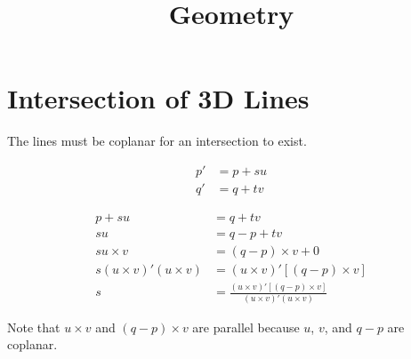 \documentclass{article}
\begin{document}
\title{Geometry}
\author{}
\date{}
\maketitle

\section{Intersection of 3D Lines}

The lines must be coplanar for an intersection to exist.

\begin{align}
p' &= p + su \\
q' &= q + tv
\end{align}

\begin{align}
p + su &= q + tv \\
su &= q - p + tv \\
su \times v &= (q - p) \times v + 0 \\
s (u \times v)'(u \times v) &= (u \times v)'[(q - p) \times v] \\
s &= \frac{(u \times v)'[(q - p) \times v]}{(u \times v)'(u \times v)}
\end{align}

Note that $u \times v$ and $(q-p) \times v$ are parallel because $u$, $v$, and $q-p$ are coplanar.
\end{document}
